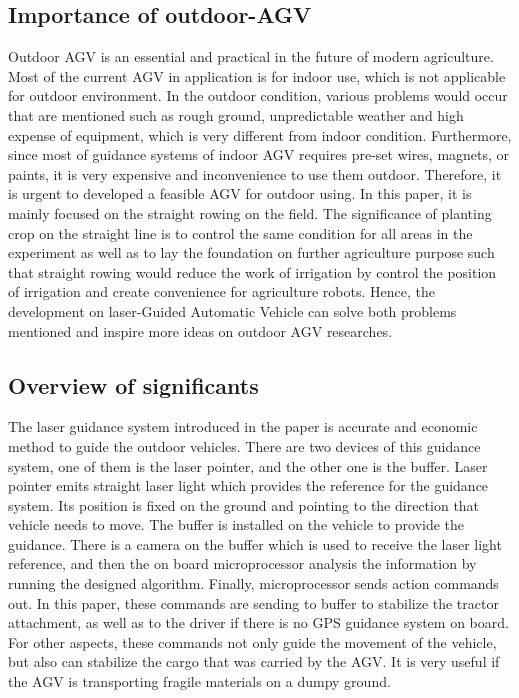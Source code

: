 \documentclass[12pt]{article}
\begin{document}
\begin{flushleft}
\subsection{Importance of outdoor-AGV}
Outdoor AGV is an essential and practical in the future of modern agriculture. Most of the current AGV in application is for indoor use, which is not applicable for outdoor environment. In the outdoor condition, various problems would occur that are mentioned such as rough ground, unpredictable weather and high expense of equipment, which is very different from indoor condition. Furthermore, since most of guidance systems of indoor AGV requires pre-set wires, magnets, or paints, it is very expensive and inconvenience to use them outdoor. Therefore, it is urgent to developed a feasible AGV for outdoor using. In this paper, it is mainly focused on the straight rowing on the field. The significance of planting crop on the straight line is to control the same condition for all areas in the experiment as well as to lay the foundation on further agriculture purpose such that straight rowing would reduce the work of irrigation by control the position of irrigation and create convenience for agriculture robots. Hence, the development on laser-Guided Automatic Vehicle can solve both problems mentioned and inspire more ideas on outdoor AGV researches.

\subsection{Overview of significants}
The laser guidance system introduced in the paper is accurate and economic method to guide the outdoor vehicles. There are two devices of this guidance system, one of them is the laser pointer, and the other one is the buffer. Laser pointer emits straight laser light which provides the reference for the guidance system. Its position is fixed on the ground and pointing to the direction that vehicle needs to move. The buffer is installed on the vehicle to provide the guidance. There is a camera on the buffer which is used to receive the laser light reference, and then the on board microprocessor analysis the information by running the designed algorithm. Finally, microprocessor sends action commands out. In this paper, these commands are sending to buffer to stabilize the tractor attachment, as well as to the driver if there is no GPS guidance system on board. For other aspects, these commands not only guide the movement of the vehicle, but also can stabilize the cargo that was carried by the AGV. It is very useful if the AGV is transporting fragile materials on a dumpy ground.



\end{flushleft}
\end{document}
